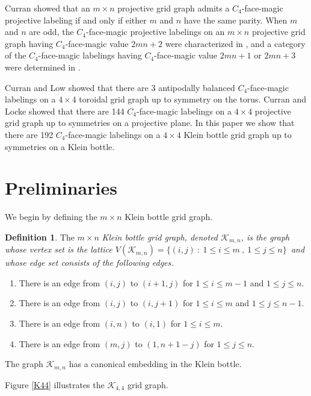 \documentclass[10pt, reqno]{amsart}
\theoremstyle{definition}
\newtheorem{definition}{Definition}
\theoremstyle{plain}
\begin{document}
Curran \cite{Curran2} showed that an $m \times n$ projective grid graph  admits a $C_4$-face-magic 
projective labeling if and only if either $m$ and $n$ 
have the same parity.
When $m$ and $n$ are odd, the $C_4$-face-magic projective labelings on an $m \times n$ projective grid graph
having $C_4$-face-magic value $2mn+2$ were characterized in \cite{Curran2},
and a category of the $C_4$-face-magic labelings 
having $C_4$-face-magic value $2mn+1$ or $2mn+3$
were determined in \cite{Curran3}.

Curran and Low \cite{CurranLow} showed that there are
3 antipodally balanced $C_4$-face-magic labelings on 
a $4\times 4$ toroidal grid graph up to symmetry on the torus.
Curran and Locke \cite{CurranLocke3} showed that
there are 144 $C_4$-face-magic labelings on 
a $4\times 4$ projective grid graph up to
symmetries on a projective plane.
In this paper we show that there are 192 
 $C_4$-face-magic labelings on 
a $4\times 4$ Klein bottle grid graph up to
symmetries on a Klein bottle.

\section{Preliminaries}

We begin by defining the $m\times n$ Klein bottle grid graph.
\begin{definition}
   The $m\times n$ \it Klein bottle grid graph\rm, denoted $\mathcal{K}_{m,n}$, is the graph whose vertex set is the lattice $V(\mathcal{K}_{m,n})=\big\{(i,j)\  : \ 1\le i\le m\ ,\ 1\le j\le n  \big\}$\ and whose edge set consists of the following edges. 
\begin{enumerate}
    \item[(i)]There is an edge from $(i,j)$ to $(i+1,j)$ for $1\le i\le m-1$ and $1\le j\le n$.
    \item[(ii)]There is an edge from $(i,j)$ to $(i, j+1)$ for $1\le i\le m$ and $1\le j\le n-1$.
    \item[(iii)]There is an edge from $(i,n)$ to $(i,1)$ for $1\le i\le m$.
    \item[(iv)]There is an edge from $(m,j)$ to $(1, n+1-j)$ for $1\le j\le n$.
\end{enumerate}

   The graph $\mathcal{K}_{m,n}$ has a canonical embedding in the Klein bottle. 
\end{definition}

Figure \ref{K44} illustrates the $\mathcal{K}_{4,4}$ grid graph. 
\end{document}
